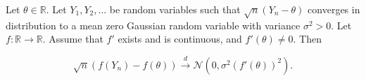 \begin{theorem}\label{mathstats.delta.method.thm} Let \(\theta \in \mathbb{R}\). Let \(Y_1, Y_2, \ldots\) be random variables such that \(\sqrt{n}(Y_n - \theta)\) converges in distribution to a mean zero Gaussian random variable with variance \(\sigma^2 > 0\). Let \(f: \mathbb{R} \to \mathbb{R}\). Assume that \(f'\) exists and is continuous, and \(f'(\theta) \neq 0\). Then

\[
\sqrt{n}(f(Y_n) - f(\theta)) \xrightarrow{d} \mathcal{N}(0, \sigma^2(f'(\theta))^2).
\]


\end{theorem}

